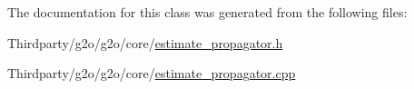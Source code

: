 The documentation for this class was generated from the following files\+:\begin{DoxyCompactItemize}
\item 
Thirdparty/g2o/g2o/core/\mbox{\hyperlink{estimate__propagator_8h}{estimate\+\_\+propagator.\+h}}\item 
Thirdparty/g2o/g2o/core/\mbox{\hyperlink{estimate__propagator_8cpp}{estimate\+\_\+propagator.\+cpp}}\end{DoxyCompactItemize}
